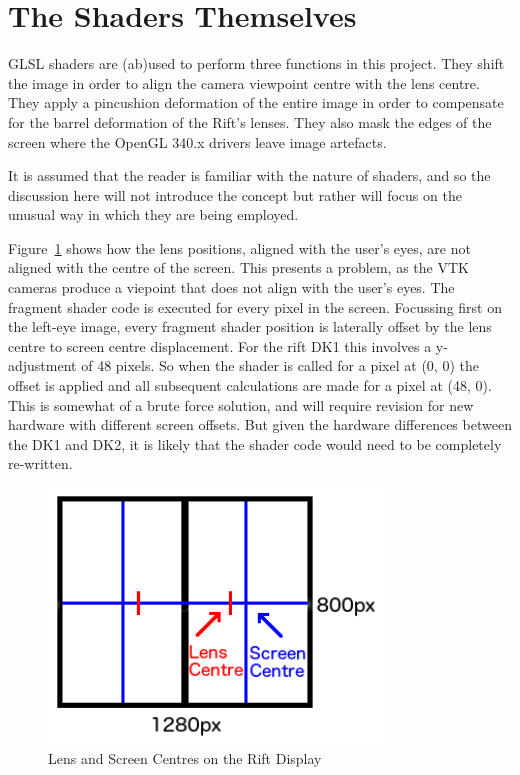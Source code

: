\documentclass[MSc,paper=a4,pagesize=auto]{icldt}
\begin{document}
\section{The Shaders Themselves}
GLSL shaders are (ab)used to perform three functions in this project. They shift the image in order to align the camera viewpoint centre with the lens centre. They apply a pincushion deformation of the entire image in order to compensate for the barrel deformation of the Rift's lenses.  They also mask the edges of the screen where the OpenGL 340.x drivers leave image artefacts. 

It is assumed that the reader is familiar with the nature of shaders, and so the discussion here will not introduce the concept but rather will focus on the unusual way in which they are being employed. 

Figure~\ref{fig:rift_screen} shows how the lens positions, aligned with the user's eyes, are not aligned with the centre of the screen. This presents a problem, as the VTK cameras produce a viepoint that does not align with the user's eyes. The fragment shader code is executed for every pixel in the screen. Focussing first on the left-eye image, every fragment shader position is laterally offset by the lens centre to screen centre displacement. For the rift DK1 this involves a y-adjustment of 48 pixels. So when the shader is called for a pixel at (0, 0) the offset is applied and all subsequent calculations are made for a pixel at (48, 0). This is somewhat of a brute force solution, and will require revision for new hardware with different screen offsets. But given the hardware differences between the DK1 and DK2, it is likely that the shader code would need to be completely re-written.

\begin{figure}[htbp!]
    \centering
    \includegraphics[width=0.8\textwidth]{resources/rift_screen}
    \caption{Lens and Screen Centres on the Rift Display}
    \label{fig:rift_screen}
\end{figure}
\end{document}
